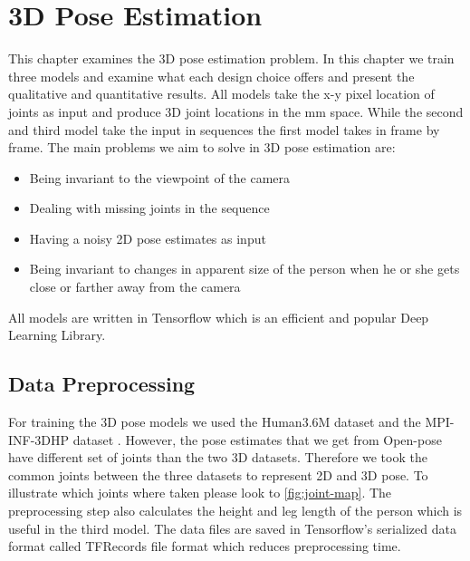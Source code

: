 
\chapter{3D Pose Estimation}\label{chapter:3Dpose}

This chapter examines the 3D pose estimation problem. In this chapter we train three models and examine what each design choice offers and present the qualitative and quantitative results. All models take the x-y pixel location of joints as input and produce 3D joint locations in the mm space. While the second and third model take the input in sequences the first model takes in frame by frame. The main problems we aim to solve in 3D pose estimation are:
\begin{itemize}
    \item Being invariant to the viewpoint of the camera
    \item Dealing with missing joints in the sequence
    \item Having a noisy 2D pose estimates as input
    \item Being invariant to changes in apparent size of the person when he or she gets close or farther away from the camera
\end{itemize}

All models are written in Tensorflow \parencite{abadi2016tensorflow} which is an efficient and popular Deep Learning Library.

\section{Data Preprocessing}

For training the 3D pose models we used the Human3.6M dataset \parencite{ionescu2014human3} and the MPI-INF-3DHP dataset \parencite{mehta2017monocular}. However, the pose estimates that we get from Open-pose \parencite{cao2016realtime} have different set of joints than the two 3D datasets. Therefore we took the common joints between the three datasets to represent 2D and 3D pose. To illustrate which joints where taken please look to \autoref{fig:joint-map}. The preprocessing step also calculates the height and leg length of the person which is useful in the third model. The data files are saved in Tensorflow's \parencite{abadi2016tensorflow} serialized data format called TFRecords file format which reduces preprocessing time.

